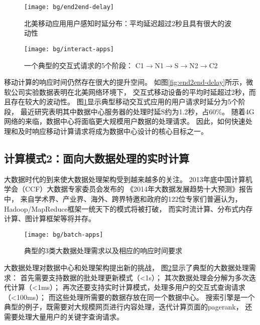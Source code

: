 \begin{figure}
\begin{minipage}{0.48\textwidth}
  \centering
  \texttt{[image: bg/end2end-delay]}
  \caption[北美移动应用用户感知时延分布]{北美移动应用用户感知时延分布：平均延迟超过2秒且具有很大的波动性}
  \label{fig:end2end-delay}
\end{minipage}\hfill
\begin{minipage}{0.48\textwidth}
  \centering
  \texttt{[image: bg/interact-apps]}
  \caption[一个典型的交互式请求的5个阶段]{一个典型的交互式请求的5个阶段：
    C1$\rightarrow$N1$\rightarrow$S$\rightarrow$N2$\rightarrow$C2\cite{timecard:2013}}
  \label{fig:interact-apps}
\end{minipage}
\end{figure}

移动计算的响应时间仍然存在很大的提升空间。
如图\ref{fig:end2end-delay}所示，微软公司实验数据表明在北美网络环境下，
交互式移动设备的平均时延超过2秒，而且存在较大的波动性。
图\ref{fig:interact-apps}显示典型移动交互式应用的用户请求时延分为5个阶段，
最近研究\cite{timecard:2013}表明其中数据中心服务器的处理时延S约为1.2秒，占60\%。
随着4G网络的来临，数据中心将面临更大规模用户数据的处理请求。
因此，如何快速处理和及时响应移动计算请求将成为数据中心设计的核心目标之一。


\subsection*{计算模式2：面向大数据处理的实时计算}

大数据时代的到来使大数据处理架构受到越来越多的关注。
2013年底中国计算机学会（CCF）大数据专家委员会发布的
《2014年大数据发展趋势十大预测》报告中，
来自学术界、产业界、海外、跨界特邀和政府的122位专家们普遍认为，
Hadoop/MapReduce框架一统天下的模式将被打破，
而实时流计算、分布式内存计算、图计算框架等将并存。

\begin{figure}[H]
  \centering
  \texttt{[image: bg/batch-apps]}
  \caption{典型的3类大数据处理需求以及相应的响应时间要求}
  \label{fig:batch-apps}
\end{figure}


大数据处理对数据中心和处理架构提出新的挑战，
图\ref{fig:batch-apps}显示了典型的大数据处理需求：
首先需要支持数据的批处理更新模式（<1s）；
其次数据处理会分解为多次迭代计算（<1ms）；
再次还要支持实时计算模式，处理多用户的交互式查询请求（<100ms）；
而这些处理所需要的数据存放在同一个数据中心。
搜索引擎是一个典型的例子，既需要对大规模网页进行内容处理，迭代计算页面的pagerank，
还需要处理大量用户的关键字查询请求。

